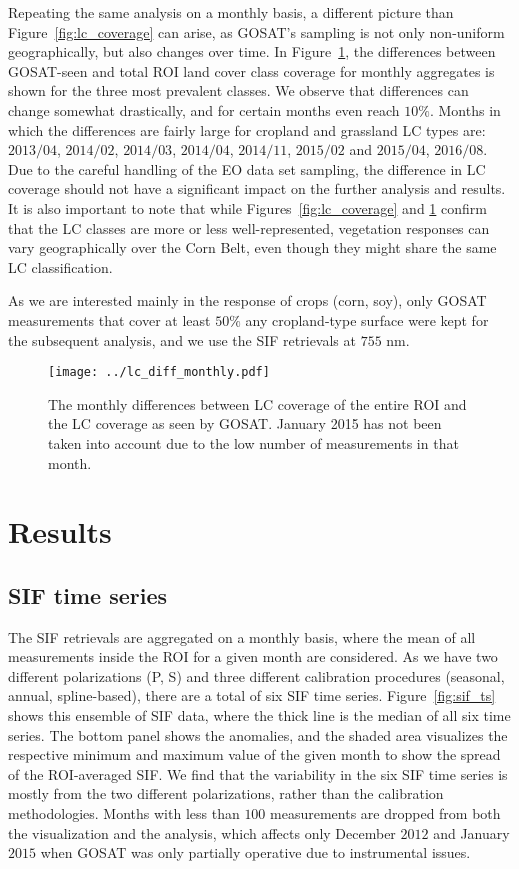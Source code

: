 \documentclass[preprint, a4paper, 10pt, times]{elsarticle}
\begin{document}
Repeating the same analysis on a monthly basis, a different picture than Figure~\ref{fig:lc_coverage} can arise, as GOSAT's sampling is not only non-uniform geographically, but also changes over time. In Figure~\ref{fig:lc_diff_monthly}, the differences between GOSAT-seen and total ROI land cover class coverage for monthly aggregates is shown for the three most prevalent classes. We observe that differences can change somewhat drastically, and for certain months even reach $10\%$. Months in which the differences are fairly large for cropland and grassland LC types are: $2013/04$, $2014/02$, $2014/03$, $2014/04$, $2014/11$, $2015/02$ and $2015/04$, $2016/08$. Due to the careful handling of the EO data set sampling, the difference in LC coverage should not have a significant impact on the further analysis and results. It is also important to note that while Figures~\ref{fig:lc_coverage} and \ref{fig:lc_diff_monthly} confirm that the LC classes are more or less well-represented, vegetation responses can vary geographically over the Corn Belt, even though they might share the same LC classification.

As we are interested mainly in the response of crops (corn, soy), only GOSAT measurements that cover at least $50\%$ any cropland-type surface were kept for the subsequent analysis, and we use the SIF retrievals at $755$ nm.

 
\begin{figure}[htbp]
\centering
\texttt{[image: ../lc\_diff\_monthly.pdf]}
\caption{The monthly differences between LC coverage of the entire ROI and the LC coverage as seen by GOSAT. January 2015 has not been taken into account due to the low number of measurements in that month.}
\label{fig:lc_diff_monthly}
\end{figure}

 
\section{Results}

\subsection{SIF time series}
\label{sec:SIF_TS}

The SIF retrievals are aggregated on a monthly basis, where the mean of all measurements inside the ROI for a given month are considered. As we have two different polarizations (P, S) and three different calibration procedures (seasonal, annual, spline-based), there are a total of six SIF time series. Figure~\ref{fig:sif_ts} shows this ensemble of SIF data, where the thick line is the median of all six time series. The bottom panel shows the anomalies, and the shaded area visualizes the respective minimum and maximum value of the given month to show the spread of the ROI-averaged SIF. We find that the variability in the six SIF time series is mostly from the two different polarizations, rather than the calibration methodologies. Months with less than $100$ measurements are dropped from both the visualization and the analysis, which affects only December $2012$ and January $2015$ when GOSAT was only partially operative due to instrumental issues.
\end{document}
